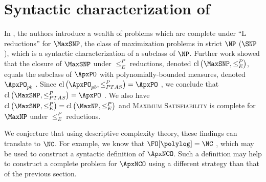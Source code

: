 \section{Syntactic characterization of \texorpdfstring{\ApxNCO}{ApxNCO}}

In \cite{py91}, the authors introduce a wealth of problems which are complete under ``L reductions'' for $\MaxSNP$, the class of maximization problems in strict $\NP$ ($\SNP$), which is a syntactic characterization of a subclass of $\NP$.
Further work showed that the closure of $\MaxSNP$ under $\leq^P_E$ reductions, denoted $\cl\left(\MaxSNP, \leq^P_E\right)$, equals the subclass of $\ApxPO$ with polynomially-bounded measures, denoted $\ApxPO_{pb}$ \cite[Theorem~1]{kmsv98}.
Since $\cl\left(\ApxPO_{pb}, \leq^P_{PTAS}\right) = \ApxPO$ \cite{ct00}, we conclude that $\cl\left(\MaxSNP, \leq^P_{PTAS}\right) = \ApxPO$ \cite{kmsv98}.
We also have $\cl\left(\MaxSNP, \leq^P_E\right) = \cl\left(\MaxNP, \leq^P_E\right)$ \cite[Theorem~2]{kmsv98} and \textsc{Maximum Satisfiability} is complete for $\MaxNP$ under $\leq^P_E$ reductions.

We conjecture that using descriptive complexity theory, these findings can translate to $\NC$.
For example, we know that $\FO[\polylog] = \NC$ \cite[Theorem~5.2]{immerman99}, which may be used to construct a syntactic definition of $\ApxNCO$.
Such a definition may help to construct a complete problem for $\ApxNCO$ using a different strategy than that of the previous section.





